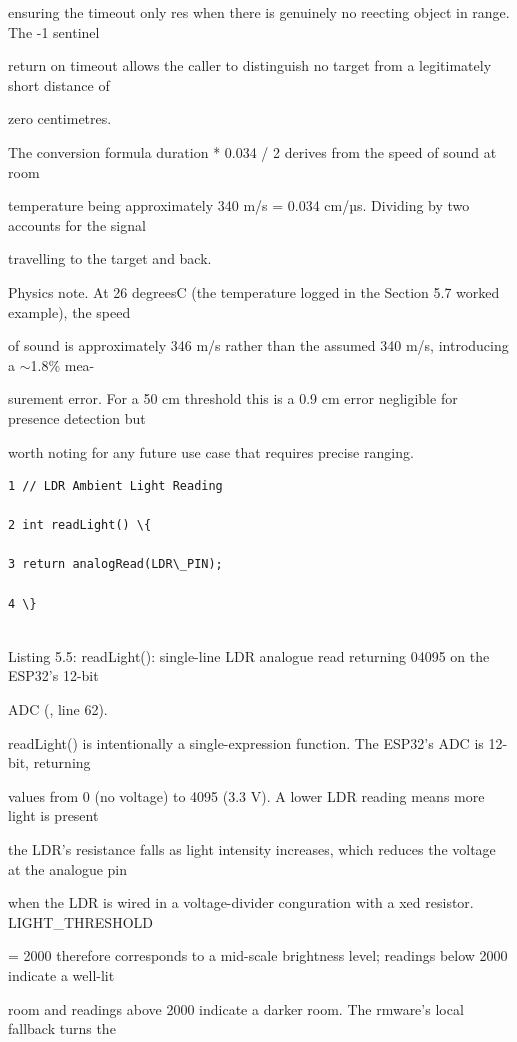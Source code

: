 ensuring the timeout only res when there is genuinely no reecting object in range. The -1 sentinel

return on timeout allows the caller to distinguish no target from a legitimately short distance of

zero centimetres.

The conversion formula  duration * 0.034 / 2  derives from the speed of sound at room

temperature being approximately 340 m/s = 0.034 cm/µs. Dividing by two accounts for the signal

travelling to the target and back.

Physics note. At 26 degreesC (the temperature logged in the Section 5.7 worked example), the speed

of sound is approximately 346 m/s rather than the assumed 340 m/s, introducing a $\sim$1.8\% mea-

surement error. For a 50 cm threshold this is a 0.9 cm error  negligible for presence detection but

worth noting for any future use case that requires precise ranging.

\begin{listingbox}
	\begin{verbatim}
1 // LDR Ambient Light Reading

2 int readLight() \{

3 return analogRead(LDR\_PIN);

4 \}


\end{verbatim}
\end{listingbox}
Listing 5.5: readLight(): single-line LDR analogue read returning 04095 on the ESP32's 12-bit

ADC (, line 62).

readLight() is intentionally a single-expression function. The ESP32's ADC is 12-bit, returning

values from 0 (no voltage) to 4095 (3.3 V). A lower LDR reading means more light is present

the LDR's resistance falls as light intensity increases, which reduces the voltage at the analogue pin

when the LDR is wired in a voltage-divider conguration with a xed resistor. LIGHT\_THRESHOLD

= 2000 therefore corresponds to a mid-scale brightness level; readings below 2000 indicate a well-lit

room and readings above 2000 indicate a darker room. The rmware's local fallback turns the

